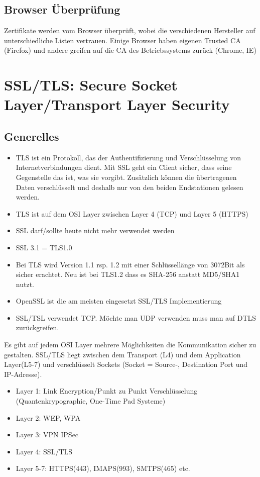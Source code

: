 \subsection{Browser Überprüfung}
Zertifikate werden vom Browser überprüft, wobei die verschiedenen Hersteller auf unterschiedliche Listen vertrauen. Einige Browser haben eigenen Trusted CA (Firefox) und andere greifen auf die CA des Betriebssystems zurück (Chrome, IE)

\section{SSL/TLS: Secure Socket Layer/Transport Layer Security}
\subsection{Generelles} 
\begin{itemize}
	\item TLS ist ein Protokoll, das der Authentifizierung und Verschlüsselung von Internetverbindungen dient. Mit SSL geht ein Client sicher, dass seine Gegenstelle das ist, was sie vorgibt. Zusätzlich können die übertragenen Daten verschlüsselt und deshalb nur von den beiden Endstationen gelesen werden.
	\item TLS ist auf dem OSI Layer zwischen Layer 4 (TCP) und Layer 5 (HTTPS)
	\item SSL darf/sollte heute nicht mehr verwendet werden 
	\item SSL 3.1 = TLS1.0
	\item Bei TLS wird Version 1.1 rsp. 1.2 mit einer Schlüssellänge von 3072Bit als sicher erachtet. Neu ist bei TLS1.2 dass es SHA-256 anstatt MD5/SHA1 nutzt.
	\item OpenSSL ist die am meisten eingesetzt SSL/TLS Implementierung
	\item SSL/TSL verwendet TCP. Möchte man UDP verwenden muss man auf DTLS zurückgreifen.
\end{itemize}

Es gibt auf jedem OSI Layer mehrere Möglichkeiten die Kommunikation sicher zu gestalten. SSL/TLS liegt zwischen dem Transport (L4) und dem Application Layer(L5-7) und verschlüsselt Sockets (Socket = Source-, Destination Port und IP-Adresse). 
\begin{itemize}
	\item Layer 1: Link Encryption/Punkt zu Punkt Verschlüsselung (Quantenkrypographie, One-Time Pad Systeme)
	\item Layer 2: WEP, WPA
	\item Layer 3: VPN IPSec
	\item Layer 4: SSL/TLS
	\item Layer 5-7: HTTPS(443), IMAPS(993), SMTPS(465) etc.
\end{itemize}

